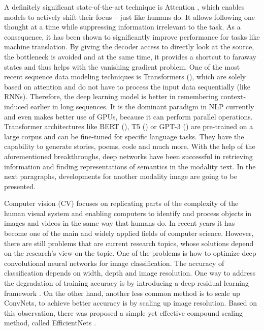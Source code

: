\documentclass[
]{krantz}
\begin{document}
A definitely significant state-of-the-art technique is Attention \citet{Bahdanau2014}, which enables models to actively shift their focus -- just like humans do. It allows following one thought at a time while suppressing information irrelevant to the task. As a consequence, it has been shown to significantly improve performance for tasks like machine translation. By giving the decoder access to directly look at the source, the bottleneck is avoided and at the same time, it provides a shortcut to faraway states and thus helps with the vanishing gradient problem. One of the most recent sequence data modeling techniques is Transformers (\citet{vaswani2017attention}), which are solely based on attention and do not have to process the input data sequentially (like RNNs). Therefore, the deep learning model is better in remembering context-induced earlier in long sequences. It is the dominant paradigm in NLP currently and even makes better use of GPUs, because it can perform parallel operations. Transformer architectures like BERT (\citet{Devlin2018}), T5 (\citet{Raffel2019}) or GPT-3 (\citet{brown2020language}) are pre-trained on a large corpus and can be fine-tuned for specific language tasks. They have the capability to generate stories, poems, code and much more. With the help of the aforementioned breakthroughs, deep networks have been successful in retrieving information and finding representations of semantics in the modality text. In the next paragraphs, developments for another modality image are going to be presented.

Computer vision (CV) focuses on replicating parts of the complexity of the human visual system and enabling computers to identify and process objects in images and videos in the same way that humans do. In recent years it has become one of the main and widely applied fields of computer science. However, there are still problems that are current research topics, whose solutions depend on the research's view on the topic. One of the problems is how to optimize deep convolutional neural networks for image classification. The accuracy of classification depends on width, depth and image resolution. One way to address the degradation of training accuracy is by introducing a deep residual learning framework \citep{ResNet}. On the other hand, another less common method is to scale up ConvNets, to achieve better accuracy is by scaling up image resolution. Based on this observation, there was proposed a simple yet effective compound scaling method, called EfficientNets \citep{EfficientNet}.
\end{document}
